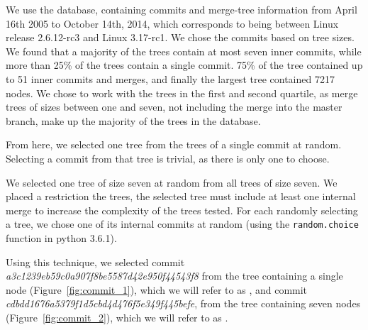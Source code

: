 \documentclass[draft]{IEEEtran}
\begin{document}
 We use the \tool database, containing commits and merge-tree
information from April 16th 2005 to October 14th, 2014, which
corresponds to being between Linux release 2.6.12-rc3 and Linux
3.17-rc1.  
We chose the commits based on tree sizes. We 
 found that a majority of the trees
contain at most seven inner commits, while more than 25\% of the trees
contain a single commit. 75\% of the tree contained up to 51 inner
commits and merges, and finally the largest tree contained 7217 nodes.
We chose to work with the trees in  the first
and second quartile, as merge trees of sizes between one and seven, not
including the merge into the master branch, make up the majority of the
trees in the database.

 From
here, we selected one tree from the trees of a single commit at random.
Selecting a commit from that tree is trivial, as there is only one to
choose.

We selected one tree of size seven at random from all trees of size
seven. We placed a restriction the trees, the
selected tree must include at least one internal merge to increase the
complexity of the trees tested. For each randomly selecting a tree, we
chose one of its internal commits at random (using the
\verb|random.choice| function in python 3.6.1).


Using this technique, we selected commit
\emph{a3c1239eb59c0a907f8be5587d42e950f44543f8} from the tree containing
a single node (Figure~\ref{fig:commit_1}), which we will refer to as
\comA, and commit \emph{cdbdd1676a5379f1d5cbd4d476f5e349f445befe}, from
the tree containing seven nodes (Figure~\ref{fig:commit_2}), which we
will refer to as \comB.
\end{document}
